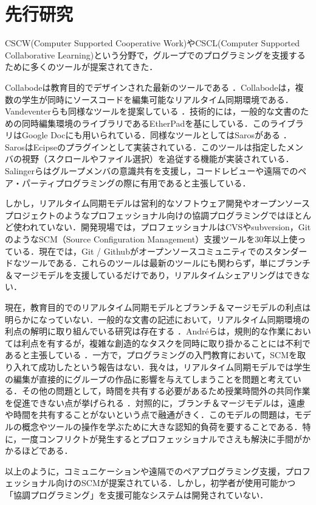 \chapter{先行研究}\label{RW}

CSCW(Computer Supported Cooperative Work)やCSCL(Computer Supported Collaborative Learning)という分野で，グループでのプログラミングを支援するために多くのツールが提案されてきた．

Collabodeは教育目的でデザインされた最新のツールである \cite{goldman2011real}．Collabodeは，複数の学生が同時にソースコードを編集可能なリアルタイム同期環境である．Vandeventerらも同様なツールを提案している \cite{vandeventer2012codewave}．技術的には，一般的な文書のための同時編集環境のライブラリであるEtherPadを基にしている．このライブラリはGoogle Docにも用いられている．同様なツールとしてはSarosがある \cite{salinger2010saros}．SarosはEcipseのプラグインとして実装されている．このツールは指定したメンバの視野（スクロールやファイル選択）を追従する機能が実装されている．Salingerらはグループメンバの意識共有を支援し，コードレビューや遠隔でのペア・パーティプログラミングの際に有用であると主張している．

しかし，リアルタイム同期モデルは営利的なソフトウェア開発やオープンソースプロジェクトのようなプロフェッショナル向けの協調プログラミングではほとんど使われていない．開発現場では，プロフェッショナルはCVSやsubversion，GitのようなSCM（Source Configuration Management）支援ツールを30年以上使っている．現在では，Git / Githubがオープンソースコミュニティでのスタンダードなツールである．これらのツールは最新のツールにも関わらず，単にブランチ＆マージモデルを支援しているだけであり，リアルタイムシェアリングはできない．

現在，教育目的でのリアルタイム同期モデルとブランチ＆マージモデルの利点は明らかになっていない．一般的な文書の記述において，リアルタイム同期環境の利点の解明に取り組んでいる研究は存在する \cite{brodahl2011collaborative}\cite{zhou2012google}．Andr\'eらは，規則的な作業においては利点を有するが，複雑な創造的なタスクを同時に取り掛かることには不利であると主張している \cite{andre2014effects}．一方で，プログラミングの入門教育において，SCMを取り入れて成功したという報告はない．我々は，リアルタイム同期モデルでは学生の編集が直接的にグループの作品に影響を与えてしまうことを問題と考えている．その他の問題として，時間を共有する必要があるため授業時間外の共同作業を促進できない点が挙げられる \cite{zhou2012google}．対照的に，ブランチ＆マージモデルは，遠慮や時間を共有することがないという点で融通がきく．このモデルの問題は，モデルの概念やツールの操作を学ぶために大きな認知的負荷を要することである．特に，一度コンフリクトが発生するとプロフェッショナルでさえも解決に手間がかかるほどである．

以上のように，コミュニケーションや遠隔でのペアプログラミング支援，プロフェッショナル向けのSCMが提案されている．しかし，初学者が使用可能かつ「協調プログラミング」を支援可能なシステムは開発されていない．